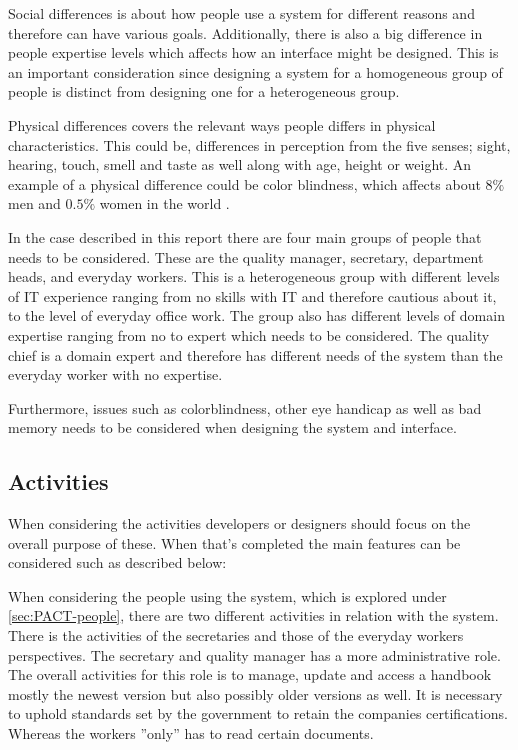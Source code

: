 Social differences is about how people use a system for different reasons and therefore can have various goals. 
Additionally, there is also a big difference in people expertise levels which affects how an interface might be designed.
This is an important consideration since designing a system for a homogeneous group of people is  distinct from designing one for a heterogeneous group. \citep{Benyon}

Physical differences covers the relevant ways people differs in physical characteristics.
This could be, differences in perception from the five senses; sight, hearing, touch, smell and taste as well along with age, height or weight. An example of a physical difference could be color blindness, which affects about $8\%$ men and $0.5\%$ women in the world \cite{ColourBlind}.

In the case described in this report there are four main groups of people that needs to be considered. These are the quality manager, secretary, department heads, and everyday workers. 
This is a heterogeneous group with different levels of IT experience ranging from no skills with IT and therefore cautious about it, to the level of everyday office work.
The group also has different levels of domain expertise ranging from no to expert which needs to be considered. 
The quality chief is a domain expert and therefore has different needs of the system than the everyday worker with no expertise.

Furthermore, issues such as colorblindness, other eye handicap as well as bad memory needs to be considered when designing the system and interface.

\subsection{Activities}\label{PACT-actvities}
When considering the activities developers or designers should focus on the overall purpose of these. When that's completed the main features can be considered such as described below:

When considering the people using the system, which is explored under \cref{sec:PACT-people}, there are two different activities in relation with the system.
There is the activities of the secretaries and those of the everyday workers perspectives.
The secretary and quality manager has a more administrative role.
The overall activities for this role is to manage, update and access a handbook mostly the newest version but also possibly older versions as well. 
It is necessary to uphold standards set by the government to retain the companies certifications.
Whereas the workers ''only'' has to read certain documents. 

